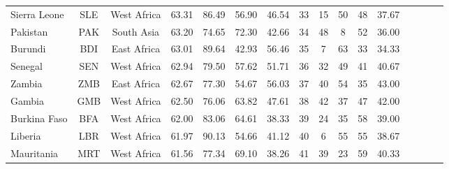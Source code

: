 \begin{singlespace}
{\begin{longtable}[H]{lccccccccccccccc}
Sierra Leone                      & SLE           & West Africa        & 63.31       & 86.49            & 56.90                     & 46.54           & 33             & 15                  & 50                           & 48                 & 37.67                  \\
Pakistan                          & PAK           & South Asia         & 63.20       & 74.65            & 72.30                     & 42.66           & 34             & 48                  & 8                            & 52                 & 36.00                  \\
Burundi                           & BDI           & East Africa        & 63.01       & 89.64            & 42.93                     & 56.46           & 35             & 7                   & 63                           & 33                 & 34.33                  \\
Senegal                           & SEN           & West Africa        & 62.94       & 79.50            & 57.62                     & 51.71           & 36             & 32                  & 49                           & 41                 & 40.67                  \\
Zambia                            & ZMB           & East Africa        & 62.67       & 77.30            & 54.67                     & 56.03           & 37             & 40                  & 54                           & 35                 & 43.00                  \\
Gambia                            & GMB           & West Africa        & 62.50       & 76.06            & 63.82                     & 47.61           & 38             & 42                  & 37                           & 47                 & 42.00                  \\
Burkina Faso                      & BFA           & West Africa        & 62.00       & 83.06            & 64.61                     & 38.33           & 39             & 24                  & 35                           & 58                 & 39.00                  \\
Liberia                           & LBR           & West Africa        & 61.97       & 90.13            & 54.66                     & 41.12           & 40             & 6                   & 55                           & 55                 & 38.67                  \\
Mauritania                        & MRT           & West Africa        & 61.56       & 77.34            & 69.10                     & 38.26           & 41             & 39                  & 23                           & 59                 & 40.33                  \\

\end{longtable}}
\end{singlespace}
